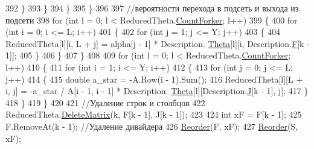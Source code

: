 \begin{DoxyCode}
392                         \}
393                     \}
394                 \}
395             \}
396 
397             \textcolor{comment}{//вероятности перехода в подсеть и выхода из подсети}
398             \textcolor{keywordflow}{for} (\textcolor{keywordtype}{int} l = 0; l < ReducedTheta.\hyperlink{class_network_descriptions_1_1_routing_matrix_a38f3c4bb00bf84fdeb4fd2c3dbdc9bfb}{CountForker}; l++)
399             \{
400                 \textcolor{keywordflow}{for} (\textcolor{keywordtype}{int} i = 0; i <= L; i++)
401                 \{
402                     \textcolor{keywordflow}{for} (\textcolor{keywordtype}{int} j = 1; j <= Y; j++)
403                     \{
404                         ReducedTheta[l][i, L + j] = alpha[j - 1] * Description.
      \hyperlink{class_network_descriptions_1_1_description_o_f_j_q_n_af8d4bf8f19a4db2daef14d0dafd77a00}{Theta}[l][i, Description.\hyperlink{class_network_descriptions_1_1_description_o_f_j_q_n_aaadbe1cc3f0bdb0bef593d2b732c988f}{F}[k - 1]];
405                     \}
406                 \}
407             \}
408 
409             \textcolor{keywordflow}{for} (\textcolor{keywordtype}{int} l = 0; l < ReducedTheta.\hyperlink{class_network_descriptions_1_1_routing_matrix_a38f3c4bb00bf84fdeb4fd2c3dbdc9bfb}{CountForker}; l++)
410             \{
411                 \textcolor{keywordflow}{for} (\textcolor{keywordtype}{int} i = 1; i <= Y; i++)
412                 \{
413                     \textcolor{keywordflow}{for} (\textcolor{keywordtype}{int} j = 0; j <= L; j++)
414                     \{
415                         \textcolor{keywordtype}{double} a\_star = -A.Row(i - 1).Sum();
416                         ReducedTheta[l][L + i, j] = -a\_star / A[i - 1, i - 1] * Description.
      \hyperlink{class_network_descriptions_1_1_description_o_f_j_q_n_af8d4bf8f19a4db2daef14d0dafd77a00}{Theta}[l][Description.\hyperlink{class_network_descriptions_1_1_description_o_f_j_q_n_a75cf16b40e07c708c6580d331e692de0}{J}[k - 1], j];
417                     \}
418                 \}
419             \}
420 
421             \textcolor{comment}{//Удаление строк и столбцов }
422             ReducedTheta.\hyperlink{class_network_descriptions_1_1_routing_matrix_a1a69e843795b875d926f77a298941c3c}{DeleteMatrix}(k, F[k - 1], J[k - 1]);
423 
424             \textcolor{keywordtype}{int} xF = F[k - 1];
425             F.RemoveAt(k - 1); \textcolor{comment}{//Удаление дивайдера}
426             \hyperlink{class_exact_network_analysis_1_1_infinity_server_open_fork_join_analizator_ac1e0bbf8c9137256c8895c3776dc6416}{Reorder}(F, xF);
427             \hyperlink{class_exact_network_analysis_1_1_infinity_server_open_fork_join_analizator_ac1e0bbf8c9137256c8895c3776dc6416}{Reorder}(S, xF);

\end{DoxyCode}

